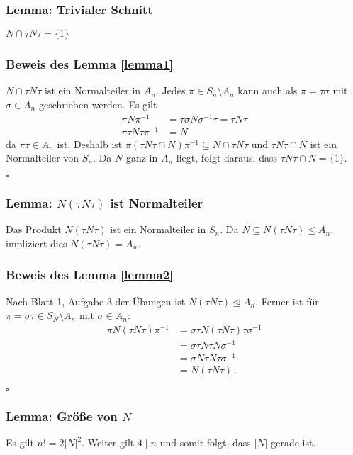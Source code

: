 \documentclass[12pt, german]{article}
\newcommand{\bewiesen}{
	
	\begin{flushright}
		$\square$  \\
\end{flushright}}
\begin{document}
	\subsubsection{Lemma: Trivialer Schnitt \label{lemma1}}
	$N \cap \tau N \tau = \{1\}$
	\subsubsection{Beweis des Lemma \ref{lemma1}}
	$N \cap \tau N \tau$ ist ein Normalteiler in $A_n$. Jedes $\pi \in S_n \setminus A_n$ kann auch als $\pi = \tau\sigma$ mit $\sigma \in A_n$ geschrieben werden.
	Es gilt
	\begin{align*}
		\pi N \pi^{-1} &= \tau \sigma N \sigma^{-1} \tau = \tau N \tau  \\ 
		\pi \tau N \tau \pi^{-1} &= N
	\end{align*} 
	da $\pi\tau \in A_n$ ist. 
	Deshalb ist $\pi(\tau N \tau \cap N) \pi^{-1} \subseteq N \cap \tau N \tau$ und $\tau N \tau \cap N$ ist ein Normalteiler von $S_n$. Da $N$ ganz in $A_n$ liegt, folgt daraus, dass $\tau N \tau \cap N = \{1\}$. 
	\bewiesen
	
	\subsubsection{Lemma: $N(\tau N\tau)$ ist Normalteiler \label{lemma2}}
	Das Produkt $N(\tau N \tau)$ ist ein Normalteiler in $S_n$. Da $N \subseteq N(\tau N \tau) \leq A_n$, impliziert dies $N(\tau N \tau) = A_n$.
	\subsubsection{Beweis des Lemma \ref{lemma2}}
	Nach Blatt 1, Aufgabe 3 der Übungen ist $N(\tau N \tau) \trianglelefteq A_n$. Ferner ist für $\pi = \sigma\tau \in S_N \setminus A_n$ mit $\sigma \in A_n$: 
	\begin{align*}
		\pi N(\tau N\tau) \pi^{-1} &= \sigma \tau N (\tau N \tau) \tau \sigma^{-1}  \\ 
		&= \sigma\tau N \tau N  \sigma^{-1} \\
		&= \sigma N \tau N \tau \sigma^{-1} \\
		&= N(\tau N \tau)\, .
	\end{align*}
	\bewiesen
	
	\subsubsection{Lemma: Grö\ss e von $N$ \label{lemma3}}
	Es gilt $n! = 2 |N|^2$. Weiter gilt $4 \mid n$ und somit folgt, dass $|N|$ gerade ist. 
\end{document}

